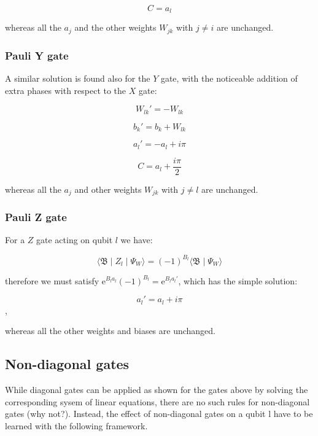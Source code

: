 \begin{equation}
   C = a_{l}
\end{equation}

whereas all the $a_{j}$ and the other weights $W_{jk}$ with $j \neq i$ are unchanged.

\subsubsection{Pauli Y gate}
A similar solution is found also for the $Y$ gate, with the noticeable addition of extra phases
with respect to the $X$ gate:

\begin{equation}
   W_{lk}\prime = -W_{lk}
\end{equation}

\begin{equation}
   b_{k}\prime = b_{k} + W_{lk}
\end{equation}

\begin{equation}
   a_{l}\prime = -a_{l} + i \pi
\end{equation}

\begin{equation}
   C = a_{l} + \frac{i \pi}{2}
\end{equation}

whereas all the $a_{j}$ and other weights $W_{jk}$ with $j \neq l$ are unchanged.

\subsubsection{Pauli Z gate}
For a $Z$ gate acting on qubit $l$ we have:

\begin{equation}
    \langle \mathfrak{B} \mid Z_{l} \mid \Psi_{W}  \rangle = 
    (-1)^{B_{l}} \langle \mathfrak{B} \mid \Psi_{W} \rangle
\end{equation}

therefore we must satisfy $\mathrm{e}^{B_{l}a_{l}}(-1)^{B_{l}} = \mathrm{e}^{B_{l}a_{l}\prime}$, which
has the simple solution:

\begin{equation}
    a_{l}\prime = a_{l} + i \pi
\end{equation},

whereas all the other weights and biases are unchanged.

\subsection{Non-diagonal gates}
While diagonal gates can be applied as shown for the gates above by solving the corresponding sysem of linear equations, 
there are no such rules for non-diagonal gates (why not?). Instead, the effect of non-diagonal gates on a qubit l have to be 
learned with the following framework.

